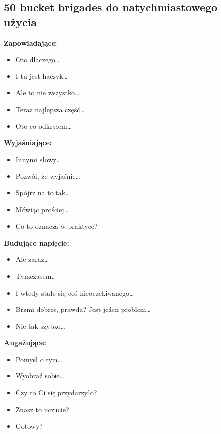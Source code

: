 \documentclass[
  12pt,
  a4paper,
  twoside,
  openright,
  12pt,
  DIV=12,
  BCOR=12mm]{scrbook}
\providecommand{\tightlist}{%
  \setlength{\itemsep}{0pt}\setlength{\parskip}{0pt}}\usepackage{longtable,booktabs,array}
\begin{document}
\subsection{50 bucket brigades do natychmiastowego
użycia}\label{bucket-brigades-do-natychmiastowego-uux17cycia}

\textbf{Zapowiadające:}

\begin{itemize}
\tightlist
\item
  Oto dlaczego\ldots{}
\item
  I tu jest haczyk\ldots{}
\item
  Ale to nie wszystko\ldots{}
\item
  Teraz najlepsza część\ldots{}
\item
  Oto co odkryłem\ldots{}
\end{itemize}

\textbf{Wyjaśniające:}

\begin{itemize}
\tightlist
\item
  Innymi słowy\ldots{}
\item
  Pozwól, że wyjaśnię\ldots{}
\item
  Spójrz na to tak\ldots{}
\item
  Mówiąc prościej\ldots{}
\item
  Co to oznacza w praktyce?
\end{itemize}

\textbf{Budujące napięcie:}

\begin{itemize}
\tightlist
\item
  Ale zaraz\ldots{}
\item
  Tymczasem\ldots{}
\item
  I wtedy stało się coś nieoczekiwanego\ldots{}
\item
  Brzmi dobrze, prawda? Jest jeden problem\ldots{}
\item
  Nie tak szybko\ldots{}
\end{itemize}

\textbf{Angażujące:}

\begin{itemize}
\tightlist
\item
  Pomyśl o tym\ldots{}
\item
  Wyobraź sobie\ldots{}
\item
  Czy to Ci się przydarzyło?
\item
  Znasz to uczucie?
\item
  Gotowy?
\end{itemize}
\end{document}
